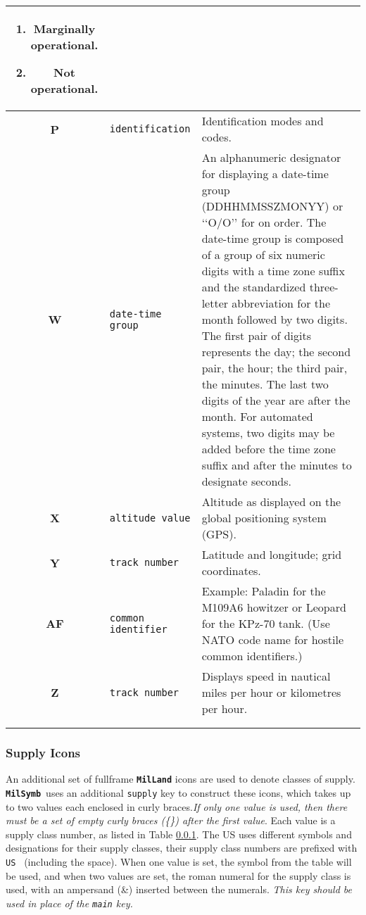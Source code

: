 \documentclass[a4paper, titlepage]{article}
\newcommand\MilSymb{\textbf{\texttt{MilSymb}}}
\begin{document}
\begin{center}
\begin{tabularx}{\textwidth}{|c|l|X|}
\begin{enumerate}[label=\arabic*.]
\item Marginally operational.
\item Not operational.
\end{enumerate} \\ \hline
\textbf{P} & \texttt{identification} & Identification modes and codes.\\ \hline
\textbf{W} & \texttt{date-time group} & An alphanumeric designator for displaying a date-time group (DDHHMMSSZMONYY) or \lq\lq{}O/O\rq\rq{} for on order. The date-time group is composed of a group of six numeric digits with a time zone suffix and the standardized three-letter abbreviation for the month followed by two digits. The first pair of digits represents the day; the second pair, the hour; the third pair, the minutes. The last two digits of the year are after the month. For automated systems, two digits may be added before the time zone suffix and after the minutes to designate seconds.\\ \hline
\textbf{X} & \texttt{altitude value} & Altitude as displayed on the global positioning system (GPS). \\ \hline
\textbf{Y} & \texttt{track number} & Latitude and longitude; grid coordinates. \\ \hline
\textbf{AF} & \texttt{common identifier} & Example: Paladin for the M109A6 howitzer or Leopard for the KPz-70 tank. (Use NATO code name for hostile common identifiers.) \\ \hline
\textbf{Z} & \texttt{track number} & Displays speed in nautical miles per hour or kilometres per hour. \\ \hline
\multicolumn{3}{c}{}\\
\caption{Description of \textbf{\texttt{MilLand}} text field amplifiers.}
\label{airtexttable}
\end{tabularx}
\end{center}

\subsubsection{Supply Icons}

An additional set of fullframe \textbf{\texttt{MilLand}} icons are used to denote classes of supply. \MilSymb\ uses an additional \texttt{supply} key to construct these icons, which takes up to two values each enclosed in curly braces.\textit{If only one value is used, then there must be a set of empty curly braces (\{\}) after the first value}. Each value is a supply class number, as listed in Table \ref{}. The US uses different symbols and designations for their supply classes, their supply class numbers are prefixed with \texttt{US } (including the space). When one value is set, the symbol from the table will be used, and when two values are set, the roman numeral for the supply class is used, with an ampersand (\&) inserted between the numerals. \textit{This key should be used in place of the \texttt{main} key.}
\end{document}
